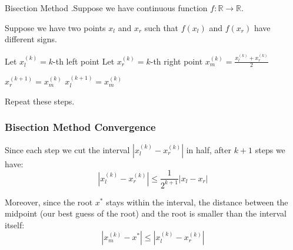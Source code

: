 \documentclass[12pt,letterpaper]{article}
\newcommand{\R}{\mathbb{R}}
\begin{document}
\begin{algo}{Bisection Method}
.Suppose we have continuous function $f: \R \rightarrow \R$.

Suppose we have two points $x_l$ and $x_r$ such that $f(x_l)$ and $f(x_r)$ have different signs.

\begin{algorithm}[H]
\caption{Find the root of $f$ using the bisection method.}
\begin{algorithmic}[1]
\Statex
{}
\State Let $x_l^{(k)} = k$-th left point 
\State Let $x_r^{(k)} = k$-th right point 
\State $x_m^{(k)} = \frac{x_l^{(k)} + x_r^{(k)}}{2}$ 
\item[]
\State $x_r^{(k+1)} = x_m^{(k)}$
\Else
\State $x_l^{(k+1)} = x_m^{(k)}$
\EndIf
\item[]
\State Repeat these steps.
\EndFunction
\end{algorithmic}
\end{algorithm}
\end{algo}

\subsubsection{Bisection Method Convergence}
Since each step we cut the interval $\left\lvert x_l^{(k)} - x_r^{(k)} \right\lvert$ in half, after $k+1$ steps we have:
\begin{equation}
	\left\lvert x_l^{(k)} - x_r^{(k)} \right\lvert \leq \frac{1}{2^{k+1}} \left\lvert x_l - x_r \right\lvert
\end{equation}

Moreover, since the root $x^*$ stays within the interval, the distance between the midpoint (our best guess of the root) and the root is smaller than the interval itself:
\begin{equation}
	\left\lvert x_m^{(k)} - x^* \right\lvert \leq \left\lvert x_l^{(k)} - x_r^{(k)} \right\lvert
\end{equation}
\end{document}
